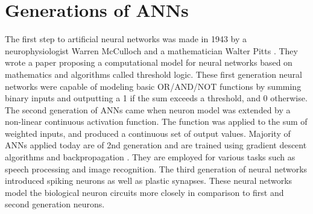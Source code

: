 \section{Generations of ANNs}
The first step to artificial neural networks was made in 1943 by a neurophysiologist Warren McCulloch and a mathematician Walter Pitts \cite{32}. They wrote a paper proposing a computational model for neural networks based on mathematics and algorithms called threshold logic. These first generation neural networks were capable of modeling basic OR/AND/NOT functions by summing binary inputs and outputting a 1 if the sum exceeds a threshold, and 0 otherwise. 
The second generation of ANNs came when neuron model was extended by a non-linear continuous activation function. The function was applied to the sum of weighted inputs, and produced a continuous set of output values. Majority of ANNs applied today are of 2nd generation and are trained using gradient descent algorithms and backpropagation \cite{33}. They are employed for various tasks such as speech processing and image recognition.
The third generation of neural networks introduced spiking neurons as well as plastic synapses. These neural networks model the biological neuron circuits more closely in comparison to first and second generation neurons. 


